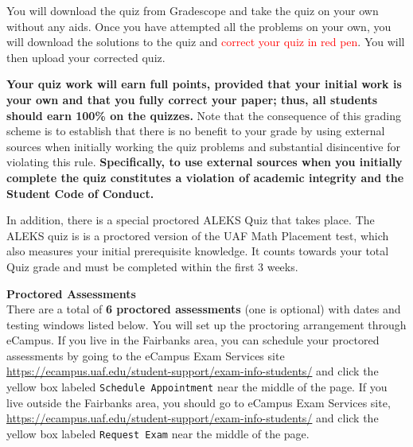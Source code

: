 \documentclass[12pt]{article}
\renewcommand{\emph}[1]{\textsf{\textbf{#1}}}
\newcommand{\localhead}[1]{\par\smallskip\textbf{#1}\nobreak\\}%
\def\heading#1{\localhead{\large\emph{#1}}}
\begin{document}
You will download the quiz from Gradescope and take the quiz on your own without any aids. Once you have attempted all the problems on your own, you will download the solutions to the quiz and \textcolor{red}{correct your quiz in red pen}. You will then upload your corrected quiz. 

\textbf{Your quiz work will earn full points, provided that your initial work is your own and that you fully correct your paper; thus, all students should earn 100\% on the quizzes.} Note that the consequence of this grading scheme is to establish that there is no benefit to your grade by using external sources when initially working the quiz problems and substantial disincentive for violating this rule. \textbf{Specifically, to use external sources when you initially complete the quiz constitutes a violation of academic integrity and the Student Code of Conduct. }

In addition, there is a special proctored ALEKS Quiz that takes place. The ALEKS quiz is is a proctored version of the UAF Math Placement test, which also measures your initial prerequisite knowledge. It counts towards your total Quiz grade and must be completed within the first 3 weeks.


\heading{Proctored Assessments}
There are a total of \emph{6 proctored assessments} (one is optional) with dates and testing windows listed below. You will set up the proctoring arrangement through eCampus.
If you live in the Fairbanks area, you can schedule your proctored assessments by going to the eCampus Exam Services site \url{https://ecampus.uaf.edu/student-support/exam-info-students/} and click the yellow box labeled {\tt{Schedule Appointment}} near the middle of the page. If you live outside the Fairbanks area, you should go to eCampus Exam Services site, \url{https://ecampus.uaf.edu/student-support/exam-info-students/} and click the yellow box labeled {\tt{Request Exam}} near the middle of the page.
\end{document}
